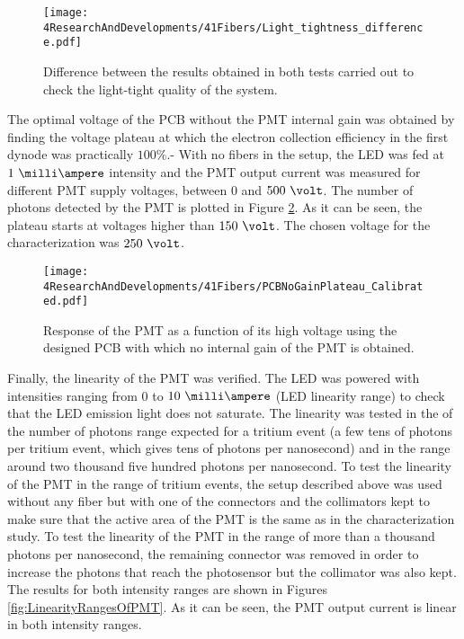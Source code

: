 \begin{figure}[h]
\centering
\texttt{[image: 4ResearchAndDevelopments/41Fibers/Light\_tightness\_difference.pdf]}
\caption{Difference between the results obtained in both tests carried out to check the light-tight quality of the system.\label{fig:LightTightnessTest}}
\end{figure}

The optimal voltage of the PCB without the PMT internal gain was obtained by finding the voltage plateau at which the electron collection efficiency in the first dynode was practically $100\%$.- With no fibers in the setup, the LED was fed at $1~\milli\ampere$ intensity and the PMT output current was measured for different PMT supply voltages, between $0$ and $500~\volt$. The number of photons detected by the PMT is plotted in Figure \ref{fig:PlateauNoGainPMT}. As it can be seen, the plateau starts at voltages higher than $150~\volt$. The chosen voltage for the characterization was $250~\volt$.

\begin{figure}[h]
\centering
\texttt{[image: 4ResearchAndDevelopments/41Fibers/PCBNoGainPlateau\_Calibrated.pdf]}
\caption{Response of the PMT as a function of its high voltage using the designed PCB with which no internal gain of the PMT is obtained.\label{fig:PlateauNoGainPMT}}
\end{figure}

Finally, the linearity of the PMT was verified. The LED was powered with intensities ranging from 0 to $10~\milli\ampere$ (LED linearity range) to check that the LED emission light does not saturate. The linearity was tested in the of the number of photons range expected for a tritium event (a few tens of photons per tritium event, which gives tens of photons per nanosecond) and in the range around two thousand five hundred photons per nanosecond. To test the linearity of the PMT in the range of tritium events, the setup described above was used without any fiber but with one of the connectors and the collimators kept to make sure that the active area of the PMT is the same as in the characterization study. To test the linearity of the PMT in the range of more than a thousand photons per nanosecond, the remaining connector was removed in order to increase the photons that reach the photosensor but the collimator was also kept. The results for both intensity ranges are shown in Figures \ref{fig:LinearityRangesOfPMT}. As it can be seen, the PMT output current is linear in both intensity ranges.

